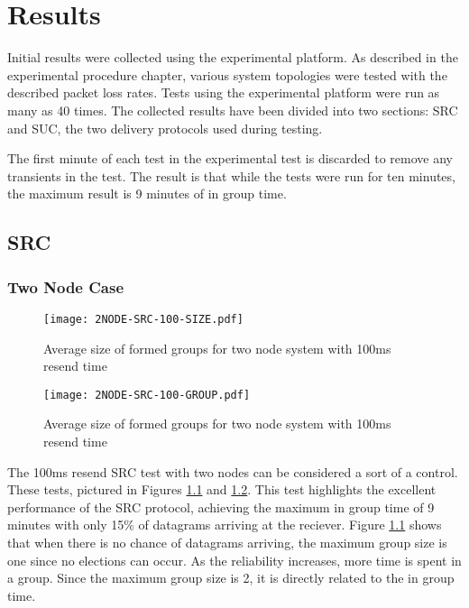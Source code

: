 \chapter{Results}

Initial results were collected using the experimental platform. As described in
the experimental procedure chapter, various system topologies were tested with
the described packet loss rates. Tests using the experimental platform were run
as many as 40 times. The collected results have been divided into two sections:
SRC and SUC, the two delivery protocols used during testing.

The first minute of each test in the experimental test is discarded to remove
any transients in the test. The result is that while the tests were run for
ten minutes, the maximum result is 9 minutes of in group time.

\section{SRC}

\subsection{Two Node Case}

\begin{figure}[!h]
\centering
\texttt{[image: 2NODE-SRC-100-SIZE.pdf]}
\caption{Average size of formed groups for two node system with 100ms resend time}
\label{fig:MGS-2NODE-100}
\end{figure}

\begin{figure}[!h]
\centering
\texttt{[image: 2NODE-SRC-100-GROUP.pdf]}
\caption{Average size of formed groups for two node system with 100ms resend time}
\label{fig:IGT-2NODE-100}
\end{figure}

The 100ms resend SRC test with two nodes can be considered a sort of a control.
These tests, pictured in Figures \ref{fig:MGS-2NODE-100} and
\ref{fig:IGT-2NODE-100}. This test highlights the excellent performance of the
SRC protocol, achieving the maximum in group time of 9 minutes with only 15\%
of datagrams arriving at the reciever. Figure \ref{fig:MGS-2NODE-100} shows
that when there is no chance of datagrams arriving, the maximum group size is
one since no elections can occur. As the reliability increases, more time is
spent in a group. Since the maximum group size is 2, it is directly related to
the in group time.

